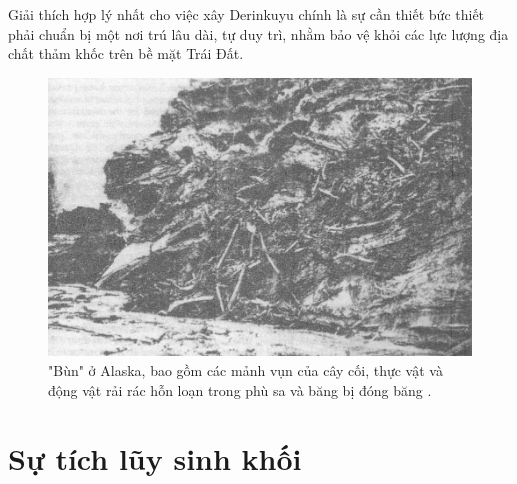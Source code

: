 \documentclass[10pt,twocolumn,letterpaper]{article}
\begin{document}
Giải thích hợp lý nhất cho việc xây Derinkuyu chính là sự cần thiết bức thiết phải chuẩn bị một nơi trú lâu dài, tự duy trì, nhằm bảo vệ khỏi các lực lượng địa chất thảm khốc trên bề mặt Trái Đất.



\begin{figure}[b]
\begin{center}
   \includegraphics[width=1\linewidth]{muck-crop.jpeg}
\end{center}
   \caption{"Bùn" ở Alaska, bao gồm các mảnh vụn của cây cối, thực vật và động vật rải rác hỗn loạn trong phù sa và băng bị đóng băng \cite{146}.}
\label{fig:7}
\label{fig:onecol}
\end{figure}

\section{Sự tích lũy sinh khối}
\end{document}
